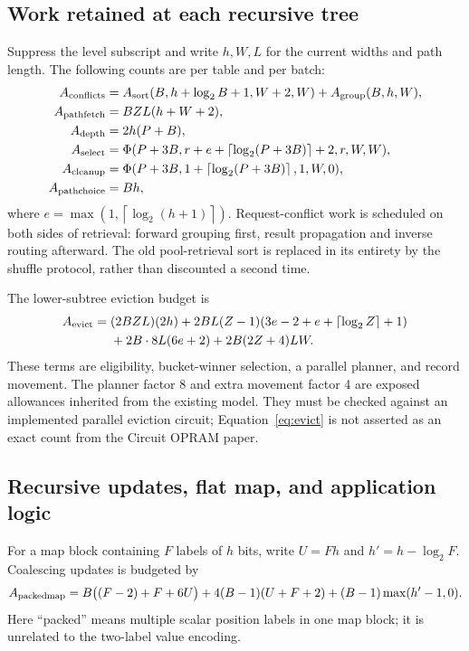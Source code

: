 \documentclass[11pt]{article}
\newcommand{\ceil}[1]{\left\lceil #1\right\rceil}
\begin{document}
\subsection{Work retained at each recursive tree}
Suppress the level subscript and write $h,W,L$ for the current widths and
path length. The following counts are per table and per batch:
\begin{align}
 A_{\rm conflicts}&=A_{\rm sort}(B,h+\log_2B+1,W+2,W)
                       +A_{\rm group}(B,h,W),\\
 A_{\rm pathfetch}&=BZL(h+W+2),\\
 A_{\rm depth}&=2h(P+B),\\
 A_{\rm select}&=\Phi(P+3B,r+e+\ceil{\log_2(P+3B)}+2,r,W,W),\\
 A_{\rm cleanup}&=\Phi(P+3B,1+\ceil{\log_2(P+3B)},1,W,0),\\
 A_{\rm pathchoice}&=Bh,
\end{align}
where $e=\max(1,\ceil{\log_2(h+1)})$. Request-conflict work is scheduled
on both sides of retrieval: forward grouping first, result propagation and
inverse routing afterward. The old pool-retrieval sort is replaced in its
entirety by the shuffle protocol, rather than discounted a second time.

The lower-subtree eviction budget is
\begin{align}
 A_{\rm evict}={}&(2BZL)(2h)
  +2BL(Z-1)(3e-2+e+\ceil{\log_2Z}+1) \nonumber\\
 &+2B\cdot8L(6e+2)+2B(2Z+4)LW.
\label{eq:evict}
\end{align}
These terms are eligibility, bucket-winner selection, a parallel planner,
and record movement. The planner factor 8 and extra movement factor 4 are
exposed allowances inherited from the existing model. They must be checked
against an implemented parallel eviction circuit; Equation~\eqref{eq:evict}
is not asserted as an exact count from the Circuit OPRAM paper.

\subsection{Recursive updates, flat map, and application logic}
For a map block containing $F$ labels of $h$ bits, write $U=Fh$ and
$h'=h-\log_2F$. Coalescing updates is budgeted by
\begin{equation}
 A_{\rm packedmap}=B\bigl((F-2)+F+6U\bigr)
       +4(B-1)(U+F+2)+(B-1)\max(h'-1,0).
\end{equation}
Here ``packed'' means multiple scalar position labels in one map block;
it is unrelated to the two-label value encoding.
\end{document}
